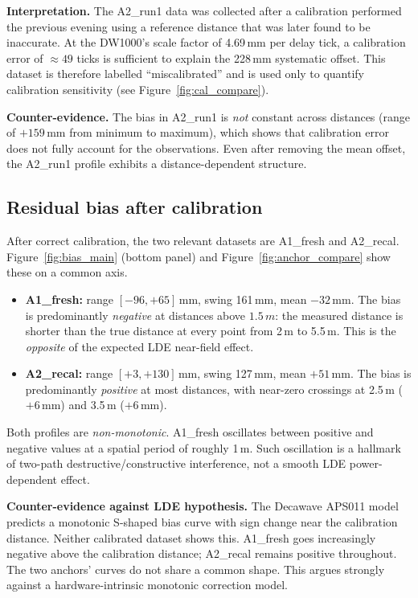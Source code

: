 \documentclass[10pt,a4paper,twocolumn]{article}
\begin{document}
\textbf{Interpretation.}  The A2\_run1 data was collected after a calibration
performed the previous evening using a reference distance that was later found
to be inaccurate.  At the DW1000's scale factor of 4.69\,mm per delay
tick, a calibration error of $\approx 49$ ticks is sufficient to explain the
228\,mm systematic offset.  This dataset is therefore labelled
``miscalibrated'' and is used only to quantify calibration sensitivity (see
Figure~\ref{fig:cal_compare}).

\textbf{Counter-evidence.}  The bias in A2\_run1 is \emph{not} constant across
distances (range of $+159$\,mm from minimum to maximum), which shows that
calibration error does not fully account for the observations.  Even after
removing the mean offset, the A2\_run1 profile exhibits a distance-dependent
structure.

\subsection{Residual bias after calibration}
\label{sec:residual}

After correct calibration, the two relevant datasets are A1\_fresh and A2\_recal.
Figure~\ref{fig:bias_main} (bottom panel) and Figure~\ref{fig:anchor_compare}
show these on a common axis.

\begin{itemize}[noitemsep]
\item \textbf{A1\_fresh:} range $[-96, +65]$\,mm, swing 161\,mm,
  mean $-32$\,mm.  The bias is predominantly \emph{negative} at distances
  above $1.5\,m$: the measured distance is shorter than the true
  distance at every point from 2\,m to 5.5\,m.  This is the
  \emph{opposite} of the expected LDE near-field effect.
\item \textbf{A2\_recal:} range $[+3, +130]$\,mm, swing 127\,mm,
  mean $+51$\,mm.  The bias is predominantly \emph{positive} at most
  distances, with near-zero crossings at 2.5\,m ($+6$\,mm) and
  3.5\,m ($+6$\,mm).
\end{itemize}

Both profiles are \emph{non-monotonic}.  A1\_fresh oscillates between positive
and negative values at a spatial period of roughly 1\,m.
Such oscillation is a hallmark of two-path destructive/constructive
interference, not a smooth LDE power-dependent effect.

\textbf{Counter-evidence against LDE hypothesis.}  The Decawave APS011 model
predicts a monotonic S-shaped bias curve with sign change near the calibration
distance.  Neither calibrated dataset shows this.  A1\_fresh goes increasingly
negative above the calibration distance; A2\_recal remains positive throughout.
The two anchors' curves do not share a common shape.  This argues strongly
against a hardware-intrinsic monotonic correction model.
\end{document}
